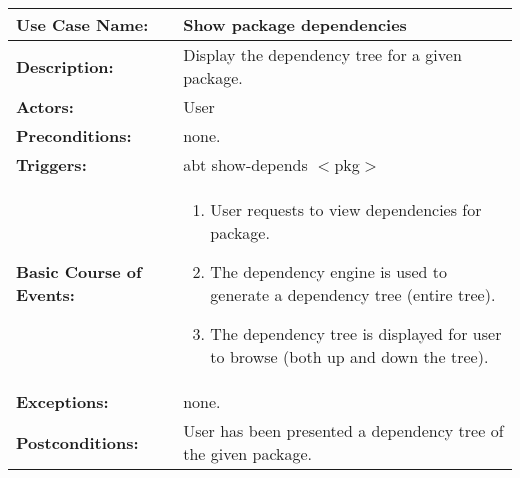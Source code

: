 
\begin{tabularx}{\linewidth}{|l|X|}
\hline
\textbf{Use Case Name:} & \textbf{Show package dependencies} \\
\hline
\textbf{Description:} & Display the dependency tree for a given package. \\
\hline
\textbf{Actors:} & User \\
\hline
\textbf{Preconditions:} & none. \\
\hline
\textbf{Triggers:} & abt show-depends $<$pkg$>$ \\
\hline
\textbf{Basic Course of Events:} & 
\begin{minipage}{\linewidth} 
  \vspace{0.05em}
  \begin{enumerate}
    \item User requests to view dependencies for package.
    \item The dependency engine is used to generate a dependency tree (entire tree).
    \item The dependency tree is displayed for user to browse (both up and down the tree).
  \end{enumerate}
  \vspace{0.05em}
\end{minipage}
\\
\hline 
\textbf{Exceptions:} & none. \\
\hline 
\textbf{Postconditions:} &
User has been presented a dependency tree of the given package. \\
\hline
\end{tabularx}


